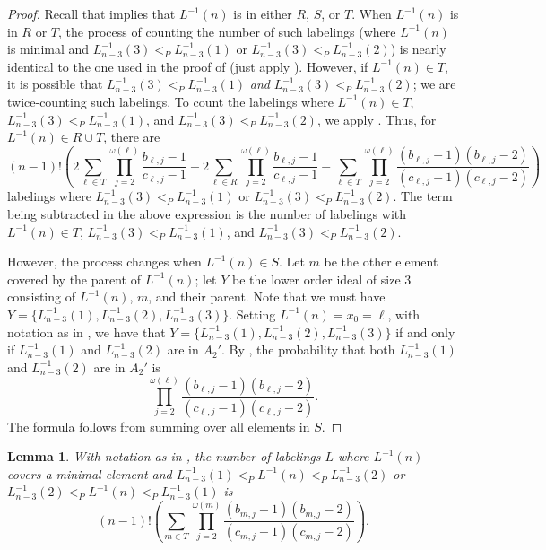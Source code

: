 \documentclass[11pt]{amsart}
\newtheorem{lemma}[thm]{Lemma}
\theoremstyle{definition}
\newcommand{\inverse}{^{-1}}
\begin{document}
\begin{proof}
	Recall that  implies that $ L\inverse(n) $ is in either $ R $, $ S $, or $ T $. When $ L\inverse(n) $ is in $ R $ or $ T $, the process of counting the number of such labelings (where $ L\inverse(n) $ is minimal and $ L_{n-3}\inverse(3)<_PL_{n-3}\inverse(1) $ or $ L_{n-3}\inverse(3)<_PL_{n-3}\inverse(2) $) is nearly identical to the one used in the proof of  (just apply ). However, if $ L\inverse(n)\in T $, it is possible that $ L_{n-3}\inverse(3)<_PL_{n-3}\inverse(1) $ \emph{and} $ L_{n-3}\inverse(3)<_PL_{n-3}\inverse(2) $; we are twice-counting such labelings. To count the labelings where $ L\inverse(n)\in T $, $ L_{n-3}\inverse(3)<_PL_{n-3}\inverse(1) $, and $ L_{n-3}\inverse(3)<_PL_{n-3}\inverse(2) $, we apply . Thus, for $ L\inverse(n)\in R\cup T $, there are \[(n-1)!\left(2\sum_{\ell\in T}\prod_{j=2}^{\omega(\ell)}\frac{b_{\ell,j}-1}{c_{\ell,j}-1}+2\sum_{\ell\in R}\prod_{j=2}^{\omega(\ell)}\frac{b_{\ell,j}-1}{c_{\ell,j}-1}-\sum_{\ell\in T}\prod_{j=2}^{\omega(\ell)}\frac{(b_{\ell,j}-1)(b_{\ell,j}-2)}{(c_{\ell,j}-1)(c_{\ell,j}-2)}\right)\] labelings where $ L_{n-3}\inverse(3)<_PL_{n-3}\inverse(1) $ or $ L_{n-3}\inverse(3)<_PL_{n-3}\inverse(2) $. The term being subtracted in the above expression is the number of labelings with  $ L\inverse(n)\in T $, $ L_{n-3}\inverse(3)<_PL_{n-3}\inverse(1) $, and $ L_{n-3}\inverse(3)<_PL_{n-3}\inverse(2) $.
	
	However, the process changes when $ L\inverse(n)\in S $. Let $ m $ be the other element covered by the parent of $ L\inverse(n) $; let $ Y $ be the lower order ideal of size 3 consisting of $ L\inverse(n)$, $ m $, and their parent. Note that we must have $ Y=\{L_{n-3}\inverse(1),L_{n-3}\inverse(2),L_{n-3}\inverse(3)\} $. Setting $ L\inverse(n)=x_0=\ell $, with notation as in , we have that $ Y=\{L_{n-3}\inverse(1),L_{n-3}\inverse(2),L_{n-3}\inverse(3)\} $ if and only if $ L_{n-3}\inverse(1) $ and $ L_{n-3}\inverse(2) $ are in $ A_2' $. By , the probability that both $ L_{n-3}\inverse(1) $ and $ L_{n-3}\inverse(2) $ are in $ A_2' $ is \[\prod_{j=2}^{\omega(\ell)}\frac{(b_{\ell,j}-1)(b_{\ell,j}-2)}{(c_{\ell,j}-1)(c_{\ell,j}-2)}.\] The formula follows from summing over all elements in $ S $.
\end{proof}
\begin{lemma}\label{L^-1(n) covers min element}
	With notation as in , the number of labelings $ L $ where $ L\inverse(n) $ covers a minimal element and $ L_{n-3}\inverse(1)<_PL\inverse(n)<_PL_{n-3}\inverse(2) $ or $ L_{n-3}\inverse(2)<_PL\inverse(n)<_PL_{n-3}\inverse(1) $ is \[(n-1)!\left(\sum_{m\in T}\prod_{j=2}^{\omega(m)}\frac{(b_{m,j}-1)(b_{m,j}-2)}{(c_{m,j}-1)(c_{m,j}-2)}\right).\]
\end{lemma}
\end{document}
